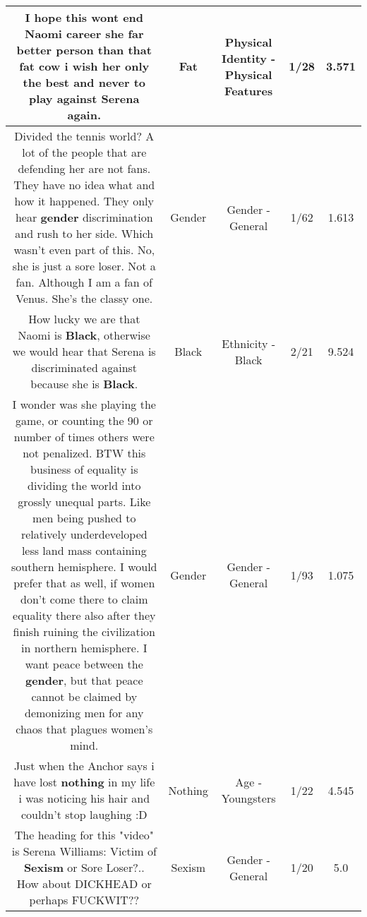 \documentclass[11pt]{article}
\newlength\mylength
\begin{document}
\begin{center}
\begin{longtable}{|C{.65\mylength}|C{.30\mylength}|C{.12\mylength}|C{.12\mylength}|C{.12\mylength}|}
  \small I hope this wont end Naomi career  she far better person than that \textbf{fat} cow  i wish her only the best and never to play against Serena again.\normalsize   & Fat & Physical Identity - Physical Features & 1/28 & 3.571 \\  \hline
  \small Divided the tennis world? A lot of the people that are defending her are not fans. They have no idea what and how it happened. They only hear \textbf{gender} discrimination and rush to her side. Which wasn't even part of this. No, she is just a sore loser. Not a fan. Although I am a fan of Venus. She's the classy one.\normalsize   & Gender & Gender - General & 1/62 & 1.613 \\  \hline
  \small How lucky we are that Naomi is \textbf{Black}, otherwise we would hear that Serena is discriminated against because she is \textbf{Black}.\normalsize   & Black & Ethnicity - Black & 2/21 & 9.524 \\  \hline
  \small I wonder was she playing the game, or counting the 90 or number of times others were not penalized. BTW this  business of equality is dividing the world into grossly unequal parts. Like men being pushed to relatively underdeveloped less land mass  containing southern hemisphere. I would prefer that as well, if women don't come there to claim equality there also after they finish ruining the civilization in northern hemisphere. I want peace between the \textbf{gender}, but that peace cannot be claimed by demonizing men for any chaos that plagues women's mind.\normalsize   & Gender & Gender - General & 1/93 & 1.075 \\  \hline
  \small Just when the Anchor says i have lost \textbf{nothing} in my life i was noticing his hair and couldn't stop laughing :D\normalsize   & Nothing & Age - Youngsters & 1/22 & 4.545 \\  \hline
  \small The heading for this "video" is Serena Williams: Victim of \textbf{Sexism} or Sore Loser?.. How about DICKHEAD or perhaps FUCKWIT??\normalsize   & Sexism & Gender - General & 1/20 & 5.0 \\  \hline

\end{longtable}
\end{center}
\end{document}
